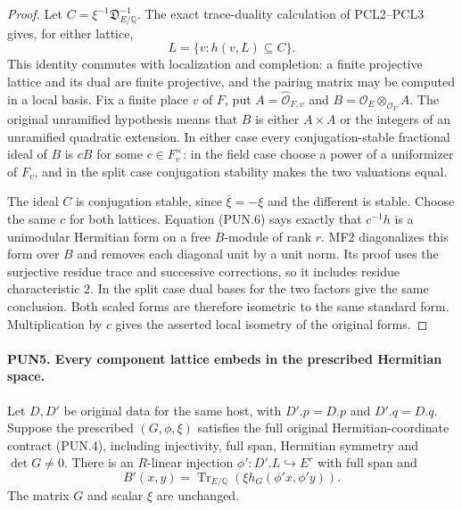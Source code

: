 \begin{proof}
Let \(C=\xi^{-1}\mathfrak D_{E/\mathbb Q}^{-1}\).  The exact
trace-duality calculation of PCL2--PCL3 gives, for either lattice,
\[
          L=\{v:h(v,L)\subseteq C\}.
 \tag{PUN.6}
\]
This identity commutes with localization and completion: a finite
projective lattice and its dual are finite projective, and the
pairing matrix may be computed in a local basis.  Fix a finite
place \(v\) of \(F\), put \(A=\widehat{\mathcal O}_{F,v}\)
and \(B=\mathcal O_E\otimes_{\mathcal O_F}A\).  The original
unramified hypothesis means that \(B\) is either \(A\times A\)
or the integers of an unramified quadratic extension.  In either
case every conjugation-stable fractional ideal of \(B\) is
\(cB\) for some \(c\in F_v^\times\): in the field case choose
a power of a uniformizer of \(F_v\), and in the split case
conjugation stability makes the two valuations equal.

The ideal \(C\) is conjugation stable, since
\(\bar\xi=-\xi\) and the different is stable.  Choose the same
\(c\) for both lattices.  Equation (PUN.6) says exactly that
\(c^{-1}h\) is a unimodular Hermitian form on a free \(B\)-module
of rank \(r\).  MF2 diagonalizes this form over \(B\) and removes
each diagonal unit by a unit norm.  Its proof uses the surjective
residue trace and successive corrections, so it includes residue
characteristic \(2\).  In the split case dual bases for the two
factors give the same conclusion.  Both scaled forms are therefore
isometric to the same standard form.  Multiplication by \(c\)
gives the asserted local isometry of the original forms.
\end{proof}

\paragraph{PUN5. Every component lattice embeds in the prescribed Hermitian space.}
\label{claim:PUN5}
Let \(D,D'\) be original data for the same host, with
\(D'.p=D.p\) and \(D'.q=D.q\).  Suppose the prescribed
\((G,\phi,\xi)\) satisfies the full original Hermitian-coordinate
contract (PUN.4), including injectivity, full span, Hermitian
symmetry and \(\det G\ne0\).  There is an \(R\)-linear
injection \(\phi':D'.L\hookrightarrow E^r\) with full span and
\[
        B'(x,y)=\operatorname{Tr}_{E/\mathbb Q}
                      (\xi h_G(\phi'x,\phi'y)).
 \tag{PUN.7}
\]
The matrix \(G\) and scalar \(\xi\) are unchanged.

